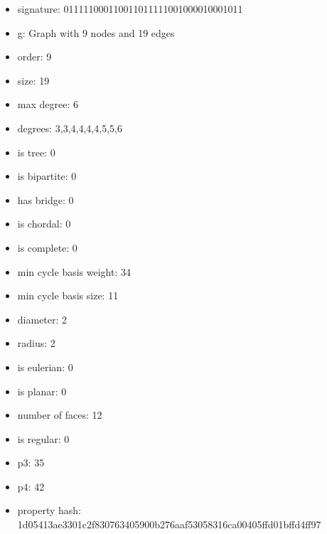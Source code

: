 \newpage
\begin{figure}
\end{figure}
\begin{itemize}
\item signature: 011111000110011011111001000010001011
\item g: Graph with 9 nodes and 19 edges
\item order: 9
\item size: 19
\item max degree: 6
\item degrees: 3,3,4,4,4,4,5,5,6
\item is tree: 0
\item is bipartite: 0
\item has bridge: 0
\item is chordal: 0
\item is complete: 0
\item min cycle basis weight: 34
\item min cycle basis size: 11
\item diameter: 2
\item radius: 2
\item is eulerian: 0
\item is planar: 0
\item number of faces: 12
\item is regular: 0
\item p3: 35
\item p4: 42
\item property hash: 1d05413ae3301c2f830763405900b276aaf53058316ca00405ffd01bffd4ff97
\end{itemize}
